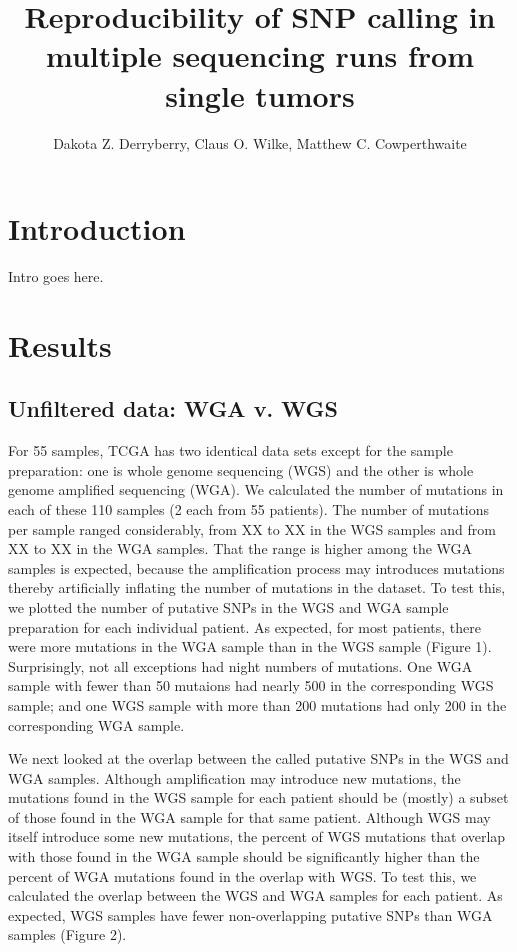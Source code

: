\documentclass[11pt]{article} %
\title{Reproducibility of SNP calling in multiple sequencing runs from single tumors}
\author{Dakota Z. Derryberry, Claus O. Wilke, Matthew C. Cowperthwaite}
\begin{document}
\maketitle

\section{Introduction}

Intro goes here.

\section{Results}

\subsection{Unfiltered data: WGA v. WGS}

For 55 samples, TCGA has two identical data sets except for the sample preparation: one is whole genome sequencing (WGS) and the other is whole genome amplified sequencing (WGA). We calculated the number of mutations in each of these 110 samples (2 each from 55 patients). The number of mutations per sample ranged considerably, from XX to XX in the WGS samples and from XX to XX in the WGA samples. That the range is higher among the WGA samples is expected, because the amplification process may introduces mutations thereby artificially inflating the number of mutations in the dataset. To test this, we plotted the number of putative SNPs in the WGS and WGA sample preparation for each individual patient. As expected, for most patients, there were more mutations in the WGA sample than in the WGS sample (Figure 1). Surprisingly, not all exceptions had night numbers of mutations. One WGA sample with fewer than 50 mutaions had nearly 500 in the corresponding WGS sample; and one WGS sample with more than 200 mutations had only 200 in the corresponding WGA sample.

We next looked at the overlap between the called putative SNPs in the WGS and WGA samples. Although amplification may introduce new mutations, the mutations found in the WGS sample for each patient should be (mostly) a subset of those found in the WGA sample for that same patient. Although WGS may itself introduce some new mutations, the percent of WGS mutations that overlap with those found in the WGA sample should be significantly higher than the percent of WGA mutations found in the overlap with WGS. To test this, we calculated the overlap between the WGS and WGA samples for each patient. As expected, WGS samples have fewer non-overlapping putative SNPs than WGA samples (Figure 2). 
\end{document}
